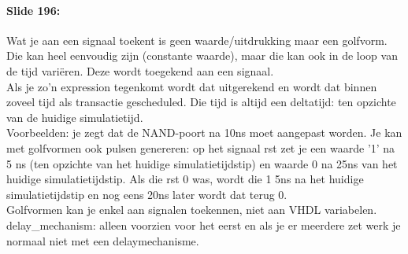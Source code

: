 \documentclass[10pt,a4paper]{book}
\begin{document}
\paragraph{Slide 196:} Wat je aan een signaal toekent is geen waarde/uitdrukking maar een golfvorm. Die kan heel eenvoudig zijn (constante waarde), maar die kan ook in de loop van de tijd vari\"eren. Deze wordt toegekend aan een signaal.\\
Als je zo'n expression tegenkomt wordt dat uitgerekend en wordt dat binnen zoveel tijd als transactie gescheduled. Die tijd is altijd een deltatijd: ten opzichte van de huidige simulatietijd.\\
Voorbeelden: je zegt dat de NAND-poort na 10ns moet aangepast worden. Je kan met golfvormen ook pulsen genereren: op het signaal rst zet je een waarde '1' na 5 ns (ten opzichte van het huidige simulatietijdstip) en waarde 0 na 25ns van het huidige simulatietijdstip. Als die rst 0 was, wordt die 1 5ns na het huidige simulatietijdstip en nog eens 20ns later wordt dat terug 0.\\
Golfvormen kan je enkel aan signalen toekennen, niet aan VHDL variabelen.\\
delay\_mechanism: alleen voorzien voor het eerst en als je er meerdere zet werk je normaal niet met een delaymechanisme.
\end{document}
